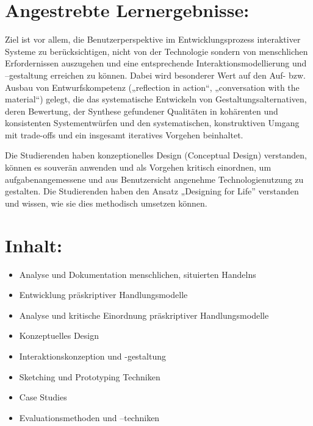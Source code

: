 \section*{Angestrebte
Lernergebnisse:\label{/mi-2017/modulbeschreibungen-master/MA_HCI_InteractionDesign}}\label{angestrebte-lernergebnissepathlabelmi-2017modulbeschreibungen-mastermaux5fhciux5finteractiondesign}

Ziel ist vor allem, die Benutzerperspektive im Entwicklungsprozess
interaktiver Systeme zu berücksichtigen, nicht von der Technologie
sondern von menschlichen Erfordernissen auszugehen und eine
entsprechende Interaktionsmodellierung und --gestaltung erreichen zu
können. Dabei wird besonderer Wert auf den Auf- bzw. Ausbau von
Entwurfskompetenz („reflection in action``, „conversation with the
material``) gelegt, die das systematische Entwickeln von
Gestaltungsalternativen, deren Bewertung, der Synthese gefundener
Qualitäten in kohärenten und konsistenten Systementwürfen und den
systematischen, konstruktiven Umgang mit trade-offs und ein insgesamt
iteratives Vorgehen beinhaltet.

Die Studierenden haben konzeptionelles Design (Conceptual Design)
verstanden, können es souverän anwenden und als Vorgehen kritisch
einordnen, um aufgabenangemessene und aus Benutzersicht angenehme
Technologienutzung zu gestalten. Die Studierenden haben den Ansatz
„Designing for Life'' verstanden und wissen, wie sie dies methodisch
umsetzen können.

\section*{Inhalt:\label{/mi-2017/modulbeschreibungen-master/MA_HCI_InteractionDesign}}\label{inhaltpathlabelmi-2017modulbeschreibungen-mastermaux5fhciux5finteractiondesign}

\begin{itemize}
\tightlist
\item
  Analyse und Dokumentation menschlichen, situierten Handelns
\item
  Entwicklung präskriptiver Handlungsmodelle
\item
  Analyse und kritische Einordnung präskriptiver Handlungsmodelle
\item
  Konzeptuelles Design
\item
  Interaktionskonzeption und -gestaltung
\item
  Sketching und Prototyping Techniken
\item
  Case Studies
\item
  Evaluationsmethoden und --techniken
\end{itemize}

